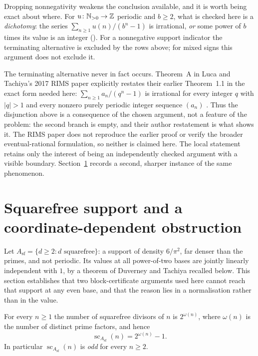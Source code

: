 \documentclass[11pt]{article}
\newcommand{\scA}{\operatorname{sc}}
\newcommand{\Asf}{A_{\mathrm{sf}}}
\begin{document}
\begin{remark}\label{res:signed}
Dropping nonnegativity weakens the conclusion available, and it is worth being
exact about where.  For $u\colon\mathbb{N}_{>0}\to\mathbb{Z}$ periodic and
$b\ge2$, what is checked here is a \emph{dichotomy}: the series
$\sum_{n\ge1}u(n)/(b^n-1)$ is irrational, \emph{or} some power of $b$ times
its value is an integer
().
For a nonnegative support indicator the terminating alternative is excluded by
the rows above; for mixed signs this argument does not exclude it.

The terminating alternative never in fact occurs.  Theorem~A in Luca and
Tachiya's 2017 RIMS paper explicitly restates their earlier Theorem~1.1 in the
exact form needed here: $\sum_{n\ge1}a_n/(q^n-1)$ is irrational for every
integer $q$ with $|q|>1$ and every nonzero purely periodic integer sequence
$(a_n)$ \cite[Theorem~A, p.~139]{lucatachiya2017}.  Thus the disjunction above
is a consequence of the chosen argument, not a feature of the problem: the second
branch is empty, and their author restatement is what shows it.  The RIMS paper
does not reproduce the earlier proof or verify the broader eventual-rational
formulation, so neither is claimed here.  The local statement retains only
the interest of being an independently checked argument with a visible
boundary.  Section~\ref{sec:squarefree} records a second, sharper instance of
the same phenomenon.
\end{remark}

\section{Squarefree support and a coordinate-dependent obstruction}
\label{sec:squarefree}

Let $\Asf=\{d\ge2: d\text{ squarefree}\}$: a support of density $6/\pi^2$, far
denser than the primes, and not periodic.  Its values at all power-of-two bases
are jointly linearly independent with \(1\), by a theorem of Duverney and
Tachiya recalled below.  This section establishes that two block-certificate
arguments used here cannot reach that support at any even base, and that the
reason lies in a normalisation rather than in the value.

\begin{theorem}\label{res:sfcount}
For every $n\ge1$ the number of squarefree divisors of $n$ is $2^{\omega(n)}$,
where $\omega(n)$ is the number of distinct prime factors, and hence
\[
  \scA_{\Asf}(n)=2^{\omega(n)}-1 .
\]
In particular $\scA_{\Asf}(n)$ is \emph{odd} for every $n\ge2$.
\end{theorem}
\end{document}

